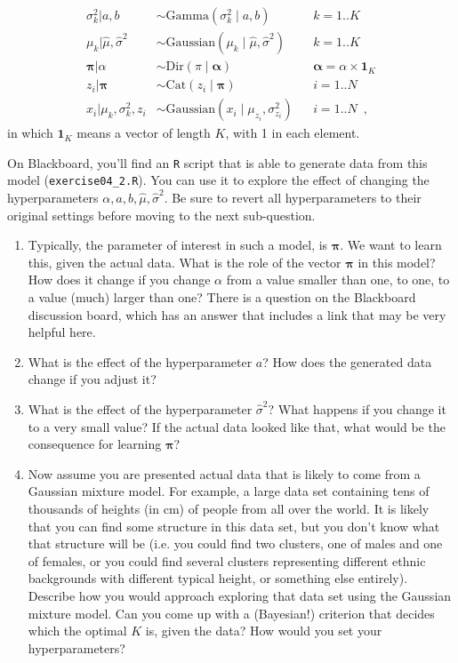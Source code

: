 \documentclass[a4paper]{article}
\renewcommand{\v}[1]{\mathbf{\bm #1}}
\begin{document}
\begin{align*}
    \sigma^2_k | a, b               &\sim \mathrm{Gamma}\left( \sigma^2_k \mid a, b \right) && k=1..K \\
    \mu_k | \hat{\mu}, \hat{\sigma}^2 &\sim \mathrm{Gaussian}\left( \mu_k \mid \hat{\mu}, \hat{\sigma}^2 \right)  && k=1..K\\
    \v{\pi} | \alpha                &\sim \mathrm{Dir}\left( \pi \mid \v{\alpha} \right) && \v{\alpha}=\alpha \times \v{1}_K\\
    z_i | \v{\pi}                   &\sim \mathrm{Cat}\left( z_i \mid \v{\pi}\right) && i=1..N\\
    x_i | \mu_k, \sigma^2_k, z_i    &\sim \mathrm{Gaussian}\left(x_i \mid \mu_{z_i}, \sigma^2_{z_i} \right) && i=1..N \enspace,
\end{align*} in which $\v{1}_K$ means a vector of length $K$, with 1 in each element.

On Blackboard, you'll find an \texttt{R} script that is able to generate data from this model (\texttt{exercise04\_2.R}). You can use it to explore the effect of changing the hyperparameters $\alpha, a, b, \hat{\mu}, \hat{\sigma}^2$. Be sure to revert all hyperparameters to their original settings before moving to the next sub-question.

\begin{enumerate}
    \item Typically, the parameter of interest in such a model, is $\v{\pi}$. We want to learn this, given the actual data. What is the role of the vector $\v{\pi}$ in this model? How does it change if you change $\alpha$ from a value smaller than one, to one, to a value (much) larger than one? There is a question on the Blackboard discussion board, which has an answer that includes a link that may be very helpful here.
    \item What is the effect of the hyperparameter $a$? How does the generated data change if you adjust it? 
    \item What is the effect of the hyperparameter $\hat{\sigma}^2$? What happens if you change it to a very small value? If the actual data looked like that, what would be the consequence for learning $\v{\pi}$?
    \item Now assume you are presented actual data that is likely to come from a Gaussian mixture model. For example, a large data set containing tens of thousands of heights (in cm) of people from all over the world. It is likely that you can find some structure in this data set, but you don't know what that structure will be (i.e. you could find two clusters, one of males and one of females, or you could find several clusters representing different ethnic backgrounds with different typical height, or something else entirely). Describe how you would approach exploring that data set using the Gaussian mixture model. Can you come up with a (Bayesian!) criterion that decides which the optimal $K$ is, given the data? How would you set your hyperparameters?
\end{enumerate}
\end{document}

